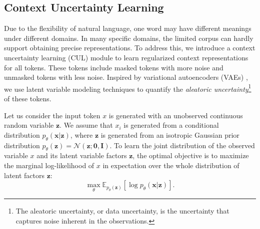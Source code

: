 \documentclass[11pt]{article}
\begin{document}
\subsection{Context Uncertainty Learning} \label{sec:cul}
Due to the flexibility of natural language, one word may have different meanings under different domains.
In many specific domains, the limited corpus can hardly support obtaining precise representations.
To address this, we introduce a context uncertainty learning (CUL) module to learn regularized context representations for all tokens.
These tokens include masked tokens with more noise and unmasked tokens with less noise.
Inspired by variational autoencoders (VAEs) \cite{DBLP:journals/corr/KingmaW13,DBLP:conf/iclr/HigginsMPBGBML17}, 
we use latent variable modeling techniques to quantify the \textit{aleatoric uncertainty}\footnote{The aleatoric uncertainty, or data uncertainty, is the uncertainty that captures noise inherent in the observations.}
\cite{der2009aleatory,abdar2021review} of these tokens.




Let us consider the input token $x$ is generated with an unobserved continuous random variable $\mathbf{z}$.
We assume that $x_i$ is generated from a conditional distribution $p_{\theta}(\mathbf{x} | \mathbf{z})$, where $\mathbf{z}$ is generated from an isotropic Gaussian prior distribution 
$p_{\theta}(\mathbf{z}) =
\mathcal{N}(\mathbf{z}; \boldsymbol{0}, \mathbf{I})$.
To learn the joint distribution of the observed variable $x$ and its latent variable factors $\mathbf{z}$, the optimal objective is to maximize the marginal log-likelihood of $x$ in expectation over the whole distribution of latent factors $\mathbf{z}$:
\begin{equation}
    \max_{\theta} \mathbb{E}_{p_{\theta}(\mathbf{z}) }
    [  \log p_\theta (\mathbf{x} | \mathbf{z})  ]. \label{eq:1}
\end{equation}
\end{document}
